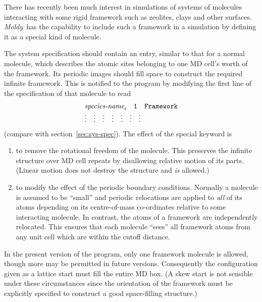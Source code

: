 \documentclass[a4paper,twoside]{report}
\newcommand{\moldy}{\emph{Moldy}}
\begin{document}
There has recently been much interest in simulations of systems of
molecules interacting with some rigid framework such as zeolites,
clays and other surfaces.  \moldy\  has the capability to include such a
framework in a simulation by defining it as a special kind of molecule.

The system specification should contain an entry, similar to that for
a normal molecule, which describes the atomic sites belonging to one
MD cell's worth of the framework.  Its periodic images should fill
space to construct the required infinite framework.  This is notified
to the program by modifying the first line of the specification of
that molecule to read
\begin{displaymath}
\begin{array}{lllllll}
\multicolumn{7}{l}{\textit{species-name}_{i} %
                  \quad \Lit{1} \quad \Lit{Framework}}  \\
\vdots & \vdots & \vdots & \vdots & \vdots & \vdots & \vdots \\
\end{array}
\end{displaymath}
(compare with section~\ref{sec:sys-spec}).  The effect of the special
keyword  is
\begin{enumerate}
\item to remove the rotational freedom of the molecule.  This
preserves the infinite structure over MD cell repeats by disallowing
relative motion of its parts. (Linear motion does not destroy the
structure and \emph{is} allowed.)
\item to modify the effect of the periodic boundary conditions.
Normally a molecule is assumed to be ``small'' and periodic relocations
are applied to \emph{all} of its atoms depending on its centre-of-mass
co-ordinates relative to some interacting molecule.  In contrast, the
atoms of a framework are independently relocated.  This ensures that
each molecule ``sees'' all framework atoms from any unit cell which
are within the cutoff distance.
\end{enumerate}

In the present version of the program, only one framework molecule is
allowed, though more may be permitted in future versions. Consequently
the configuration given as a lattice start must fill the entire MD
box. (A skew start is not sensible under these circumstances since the
orientation of the framework must be explicitly specified to construct
a good space-filling structure.)
\end{document}
